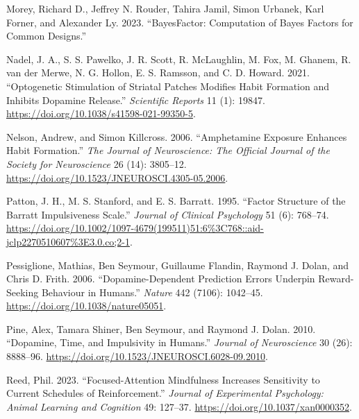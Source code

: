 \documentclass{article}
\newlength{\cslhangindent}
\newlength{\cslentryspacingunit} %
\newenvironment{CSLReferences}[2] %
 {%
  \setlength{\parindent}{0pt}
  \ifodd #1
  \let\oldpar\par
  \def\par{\hangindent=\cslhangindent\oldpar}
  \fi
  \setlength{\parskip}{#2\cslentryspacingunit}
 }%
 {}
\begin{document}
\begin{CSLReferences}{1}{0}
\leavevmode{}%
Morey, Richard D., Jeffrey N. Rouder, Tahira Jamil, Simon Urbanek, Karl
Forner, and Alexander Ly. 2023. {``{BayesFactor}: {Computation} of
{Bayes Factors} for {Common Designs}.''}

\leavevmode{}%
Nadel, J. A., S. S. Pawelko, J. R. Scott, R. McLaughlin, M. Fox, M.
Ghanem, R. van der Merwe, N. G. Hollon, E. S. Ramsson, and C. D. Howard.
2021. {``Optogenetic Stimulation of Striatal Patches Modifies Habit
Formation and Inhibits Dopamine Release.''} \emph{Scientific Reports} 11
(1): 19847. \url{https://doi.org/10.1038/s41598-021-99350-5}.

\leavevmode{}%
Nelson, Andrew, and Simon Killcross. 2006. {``Amphetamine Exposure
Enhances Habit Formation.''} \emph{The Journal of Neuroscience: The
Official Journal of the Society for Neuroscience} 26 (14): 3805--12.
\url{https://doi.org/10.1523/JNEUROSCI.4305-05.2006}.

\leavevmode{}%
Patton, J. H., M. S. Stanford, and E. S. Barratt. 1995. {``Factor
Structure of the {Barratt} Impulsiveness Scale.''} \emph{Journal of
Clinical Psychology} 51 (6): 768--74.
\url{https://doi.org/10.1002/1097-4679(199511)51:6\%3C768::aid-jclp2270510607\%3E3.0.co;2-1}.

\leavevmode{}%
Pessiglione, Mathias, Ben Seymour, Guillaume Flandin, Raymond J. Dolan,
and Chris D. Frith. 2006. {``Dopamine-Dependent Prediction Errors
Underpin Reward-Seeking Behaviour in Humans.''} \emph{Nature} 442
(7106): 1042--45. \url{https://doi.org/10.1038/nature05051}.

\leavevmode{}%
Pine, Alex, Tamara Shiner, Ben Seymour, and Raymond J. Dolan. 2010.
{``Dopamine, {Time}, and {Impulsivity} in {Humans}.''} \emph{Journal of
Neuroscience} 30 (26): 8888--96.
\url{https://doi.org/10.1523/JNEUROSCI.6028-09.2010}.

\leavevmode{}%
Reed, Phil. 2023. {``Focused-Attention Mindfulness Increases Sensitivity
to Current Schedules of Reinforcement.''} \emph{Journal of Experimental
Psychology: Animal Learning and Cognition} 49: 127--37.
\url{https://doi.org/10.1037/xan0000352}.


\end{CSLReferences}
\end{document}
